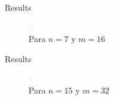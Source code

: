 \begin{frame}{Results}
    \begin{figure}
        \centering
        \includegraphics[width=8]{p7-A-discreta2.png}
        \caption{Para $n=7$ y $m=16$}
        \label{fig:enter-label}
    \end{figure}
\end{frame}
\begin{frame}{Results}
    \begin{figure}
        \centering
        \includegraphics[width=8]{p7-A-discreta3.png}
        \caption{Para $n=15$ y $m=32$}
        \label{fig:enter-label}
    \end{figure}
\end{frame}